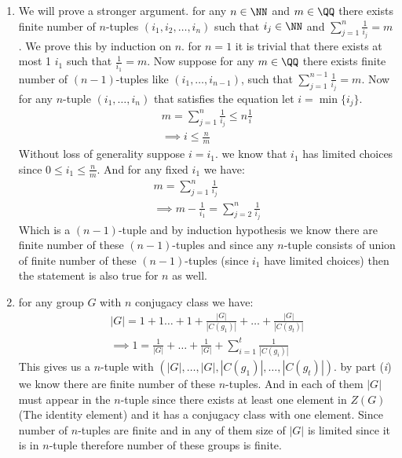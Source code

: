 \begin{enumerate}[label=\textbf{(\textit{\roman*})}]
    \item
        We will prove a stronger argument. for any $n \in \NN$ and $m \in \QQ$ there exists finite number of $n$-tuples $(i_1, i_2, \dots, i_n)$ such that $i_j \in \NN$ and $\sum_{j = 1 }^{n} \frac{1 }{i_j} = m$. \newline
        We prove this by induction on $n$. for $n = 1$ it is trivial that there exists at most 1 $i_1$ such that $\frac{1 }{i_1} = m$.
        Now suppose for any $m \in \QQ$ there exists finite number of $(n - 1)$-tuples like $(i_1, \dots, i_{n - 1})$, such that $\sum_{j = 1}^{n -1}\frac{1}{i_j} = m$.
        Now for any $n$-tuple $(i_1, \dots, i_n)$ that satisfies the equation let $i = \min\{i_j\}$.
        \begin{gather*}
            m = \sum_{j = 1 }^{n} \frac{1}{i_j} \le n \frac{1 }{i} \\
            \implies i \le \frac{n }{m}
        \end{gather*}
        Without loss of generality suppose $i = i_1$.
        we know that $i_1$ has limited choices since $0 \le i_1 \le \frac{n}{m}$.
        And for any fixed $i_1$ we have:
        \begin{gather*}
            m = \sum_{j = 1 }^{n} \frac{1}{i_j}\\
            \implies m - \frac{1}{i_1} = \sum_{j = 2}^{n} \frac{1 }{i_j}
        \end{gather*}
        Which is a $(n - 1)$-tuple and by induction hypothesis we know there are finite number of these $(n - 1)$-tuples and since any $n$-tuple consists of union of finite number of these $(n - 1)$-tuples (since $i_1$ have limited choices) then the statement is also true for $n$ as well.
    \item
        for any group $G$ with $n$ conjugacy class we have:
        \begin{gather*}
            |G| = 1 + 1 \dots + 1 + \frac{|G|}{|C(g_1)|} + \dots + \frac{|G|}{|C(g_t)|}\\
            \implies 1  = \frac{1 }{|G|} + \dots  + \frac{1 }{|G|} + \sum_{i = 1}^{t } \frac{1}{|C(g_i)|}
        \end{gather*}
        This gives us a $n$-tuple with $(|G|, \dots, |G|, |C(g_1)|, \dots, |C(g_t)|)$.
        by part (\textit{i}) we know there are finite number of these $n$-tuples.
        And in each of them $|G|$ must appear in the $n$-tuple since there exists at least one element in $Z(G)$ (The identity element) and it has a conjugacy class with one element. Since number of $n$-tuples are finite and in any of them size of $|G|$ is limited since it is in $n$-tuple therefore number of these groups is finite.
\end{enumerate}